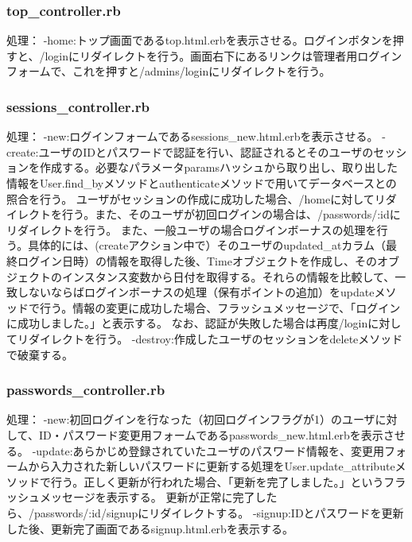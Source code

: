 \documentclass[a4j]{jarticle}
\begin{document}
\subsubsection{top\_controller.rb}
処理： \newline
-home:トップ画面であるtop.html.erbを表示させる。ログインボタンを押すと、/loginにリダイレクトを行う。画面右下にあるリンクは管理者用ログインフォームで、これを押すと/admins/loginにリダイレクトを行う。\newline

\subsubsection{sessions\_controller.rb}
処理： \newline
-new:ログインフォームであるsessions\_new.html.erbを表示させる。\newline
-create:ユーザのIDとパスワードで認証を行い、認証されるとそのユーザのセッションを作成する。必要なパラメータparamsハッシュから取り出し、取り出した情報をUser.find\_byメソッドとauthenticateメソッドで用いてデータベースとの照合を行う。
ユーザがセッションの作成に成功した場合、/homeに対してリダイレクトを行う。また、そのユーザが初回ログインの場合は、/passwords/:idにリダイレクトを行う。
また、一般ユーザの場合ログインボーナスの処理を行う。具体的には、(createアクション中で）そのユーザのupdated\_atカラム（最終ログイン日時）の情報を取得した後、Timeオブジェクトを作成し、そのオブジェクトのインスタンス変数から日付を取得する。それらの情報を比較して、一致しないならばログインボーナスの処理（保有ポイントの追加）をupdateメソッドで行う。情報の変更に成功した場合、フラッシュメッセージで、「ログインに成功しました。」と表示する。\newline
なお、認証が失敗した場合は再度/loginに対してリダイレクトを行う。\newline
-destroy:作成したユーザのセッションをdeleteメソッドで破棄する。

\subsubsection{passwords\_controller.rb}
処理：\newline
-new:初回ログインを行なった（初回ログインフラグが1）のユーザに対して、ID・パスワード変更用フォームであるpasswords\_new.html.erbを表示させる。\newline
-update:あらかじめ登録されていたユーザのパスワード情報を、変更用フォームから入力された新しいパスワードに更新する処理をUser.update\_attributeメソッドで行う。正しく更新が行われた場合、「更新を完了しました。」というフラッシュメッセージを表示する。
更新が正常に完了したら、/passwords/:id/signupにリダイレクトする。\newline
-signup:IDとパスワードを更新した後、更新完了画面であるsignup.html.erbを表示する。
\end{document}
